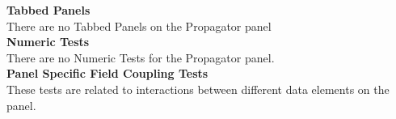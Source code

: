 \noindent\textbf{Tabbed Panels}\\

There are no Tabbed Panels on the Propagator panel\\



\noindent\textbf{Numeric Tests}\\

There are no Numeric Tests for the Propagator panel.\\



\noindent\textbf{Panel Specific Field Coupling Tests}\\

These tests are related to interactions between different data
elements on the panel.\\

